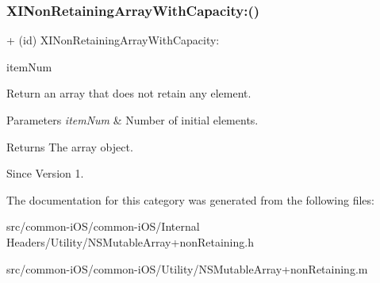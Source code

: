 \subsubsection{\texorpdfstring{X\+I\+Non\+Retaining\+Array\+With\+Capacity\+:()}{XINonRetainingArrayWithCapacity:()}}
{\footnotesize\ttfamily + (id) X\+I\+Non\+Retaining\+Array\+With\+Capacity\+: \begin{DoxyParamCaption}\item[{(N\+S\+U\+Integer)}]{item\+Num }\end{DoxyParamCaption}}



Return an array that does not retain any element. 


\begin{DoxyParams}{Parameters}
{\em item\+Num} & Number of initial elements. \\
\hline
\end{DoxyParams}
\begin{DoxyReturn}{Returns}
The array object. 
\end{DoxyReturn}
\begin{DoxySince}{Since}
Version 1. 
\end{DoxySince}


The documentation for this category was generated from the following files\+:\begin{DoxyCompactItemize}
\item 
src/common-\/i\+O\+S/common-\/i\+O\+S/\+Internal Headers/\+Utility/N\+S\+Mutable\+Array+non\+Retaining.\+h\item 
src/common-\/i\+O\+S/common-\/i\+O\+S/\+Utility/N\+S\+Mutable\+Array+non\+Retaining.\+m\end{DoxyCompactItemize}
